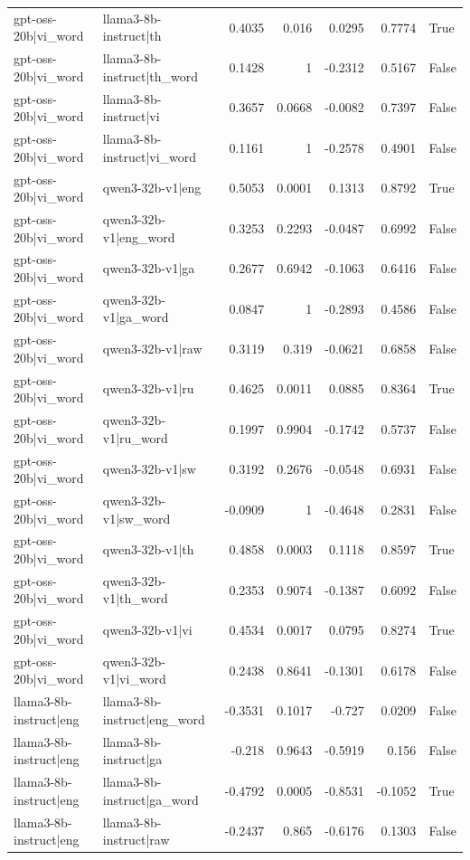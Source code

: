 \begin{table}
\begin{tabular}{l l r r r r l}
gpt-oss-20b|vi_word & llama3-8b-instruct|th & 0.4035 & 0.016 & 0.0295 & 0.7774 & True \\
gpt-oss-20b|vi_word & llama3-8b-instruct|th_word & 0.1428 & 1 & -0.2312 & 0.5167 & False \\
gpt-oss-20b|vi_word & llama3-8b-instruct|vi & 0.3657 & 0.0668 & -0.0082 & 0.7397 & False \\
gpt-oss-20b|vi_word & llama3-8b-instruct|vi_word & 0.1161 & 1 & -0.2578 & 0.4901 & False \\
gpt-oss-20b|vi_word & qwen3-32b-v1|eng & 0.5053 & 0.0001 & 0.1313 & 0.8792 & True \\
gpt-oss-20b|vi_word & qwen3-32b-v1|eng_word & 0.3253 & 0.2293 & -0.0487 & 0.6992 & False \\
gpt-oss-20b|vi_word & qwen3-32b-v1|ga & 0.2677 & 0.6942 & -0.1063 & 0.6416 & False \\
gpt-oss-20b|vi_word & qwen3-32b-v1|ga_word & 0.0847 & 1 & -0.2893 & 0.4586 & False \\
gpt-oss-20b|vi_word & qwen3-32b-v1|raw & 0.3119 & 0.319 & -0.0621 & 0.6858 & False \\
gpt-oss-20b|vi_word & qwen3-32b-v1|ru & 0.4625 & 0.0011 & 0.0885 & 0.8364 & True \\
gpt-oss-20b|vi_word & qwen3-32b-v1|ru_word & 0.1997 & 0.9904 & -0.1742 & 0.5737 & False \\
gpt-oss-20b|vi_word & qwen3-32b-v1|sw & 0.3192 & 0.2676 & -0.0548 & 0.6931 & False \\
gpt-oss-20b|vi_word & qwen3-32b-v1|sw_word & -0.0909 & 1 & -0.4648 & 0.2831 & False \\
gpt-oss-20b|vi_word & qwen3-32b-v1|th & 0.4858 & 0.0003 & 0.1118 & 0.8597 & True \\
gpt-oss-20b|vi_word & qwen3-32b-v1|th_word & 0.2353 & 0.9074 & -0.1387 & 0.6092 & False \\
gpt-oss-20b|vi_word & qwen3-32b-v1|vi & 0.4534 & 0.0017 & 0.0795 & 0.8274 & True \\
gpt-oss-20b|vi_word & qwen3-32b-v1|vi_word & 0.2438 & 0.8641 & -0.1301 & 0.6178 & False \\
llama3-8b-instruct|eng & llama3-8b-instruct|eng_word & -0.3531 & 0.1017 & -0.727 & 0.0209 & False \\
llama3-8b-instruct|eng & llama3-8b-instruct|ga & -0.218 & 0.9643 & -0.5919 & 0.156 & False \\
llama3-8b-instruct|eng & llama3-8b-instruct|ga_word & -0.4792 & 0.0005 & -0.8531 & -0.1052 & True \\
llama3-8b-instruct|eng & llama3-8b-instruct|raw & -0.2437 & 0.865 & -0.6176 & 0.1303 & False \\

\end{tabular}
\end{table}
